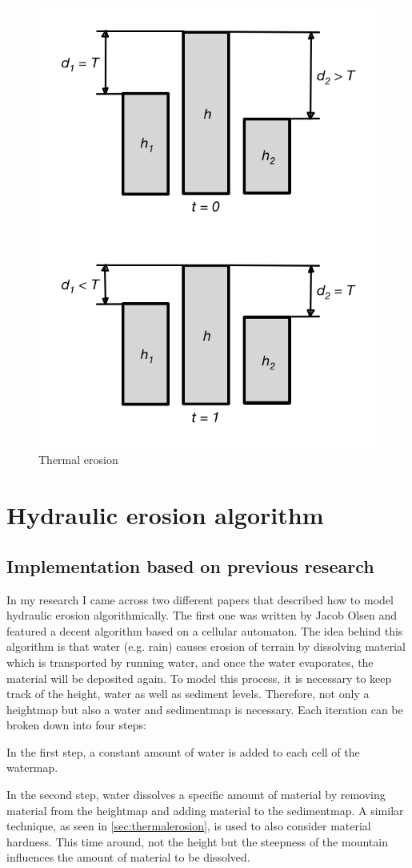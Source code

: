 \documentclass[11pt,a4paper,twoside,openright]{report}
\begin{document}
\begin{figure}[h]
\centering
\includegraphics[width=0.5\linewidth]{thermalerosion.png}
\caption{Thermal erosion}\label{fig:thermalerosion}
\end{figure}

\section{Hydraulic erosion algorithm}
\label{sec:hydraulicerosion}
\subsection{Implementation based on previous research}
In my research I came across two different papers that described how to model hydraulic erosion algorithmically. The first one \cite{Olsen:2004} was written by Jacob Olsen and featured a decent algorithm based on a cellular automaton. The idea behind this algorithm is that water (e.g. rain) causes erosion of terrain by dissolving material which is transported by running water, and once the water evaporates, the material will be deposited again. To model this process, it is necessary to keep track of the height, water as well as sediment levels. Therefore, not only a heightmap but also a water and sedimentmap is necessary. Each iteration can be broken down into four steps:

In the first step, a constant amount of water is added to each cell of the watermap.

In the second step, water dissolves a specific amount of material by removing material from the heightmap and adding material to the sedimentmap. A similar technique, as seen in \cref{sec:thermalerosion}, is used to also consider material hardness. This time around, not the height but the steepness of the mountain influences the amount of material to be dissolved.
\end{document}
